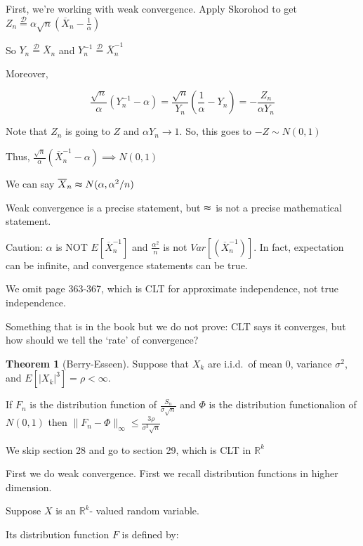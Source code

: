 \documentclass{article}
\theoremstyle{definition}
\newtheorem{theorem}{Theorem}
\begin{document}
First, we're working with weak convergence. Apply Skorohod to get \(Z_n \overset{\mathcal{D}}{=} \alpha \sqrt{n} (\overline{X} _n - \frac{1}{\alpha}) \) 

So \(Y_n \overset{\mathcal{D} }{=} \overline{X}_n\) and \(Y_n^{-1} \overset{\mathcal{D}}{=}\overline{X}_n^{-1} \) 

Moreover,

\[
    \frac{\sqrt{n}}{\alpha}(Y_n^{-1}- \alpha ) = \frac{\sqrt{n}}{Y_n}\left( \frac{1}{\alpha}- Y_n \right) = - \frac{Z_n}{\alpha Y_n}
\]

Note that \(Z_n\) is going to \(Z\) and \(\alpha Y_n \to 1\). So, this goes to \(-Z\sim N(0,1)\)  

Thus, \(\frac{\sqrt{n}}{\alpha}(\overline{X}_n^{-1}-\alpha) \implies N(0,1)\) 

We can say \(\overline{X}_n \thickapprox N(\alpha,\alpha ^2 / n)\) 

Weak convergence is a precise statement, but \(\thickapprox\) is not a precise mathematical statement.

Caution: \(\alpha\) is NOT \(E[\overline{X}_n^{-1}]\) and \(\frac{\alpha^2}{n}\) is not \(Var[(\overline{X}_n^{-1} )]\). In fact, expectation can be infinite, and convergence statements can be true.

We omit page 363-367, which is CLT for approximate independence, not true independence.

Something that is in the book but we do not prove: CLT says it converges, but how should we tell the `rate' of convergence?

\begin{theorem}
    [Berry-Esseen] Suppose that \(X_k\) are i.i.d.\ of mean \(0\), variance \(\sigma ^2\), and \(E[\vert X_k \vert ^3] = \rho < \infty\).
    
    If \(F_n\) is the distribution function of \(\frac{S_n}{\sigma \sqrt{n} }\) and \(\Phi\) is the distribution functionalion of \(N(0,1)\) then \(\lVert F_n - \Phi \rVert _\infty \leq \frac{3 \rho}{\sigma ^3 \sqrt{n} }\) 
\end{theorem}

We skip section 28 and go to section 29, which is CLT in \(\mathbb{R}^k\) 

First we do weak convergence. First we recall distribution functions in higher dimension.

Suppose \(X\) is an \(\mathbb{R} ^k\)- valued random variable.

Its distribution function \(F\) is defined by:
\end{document}

